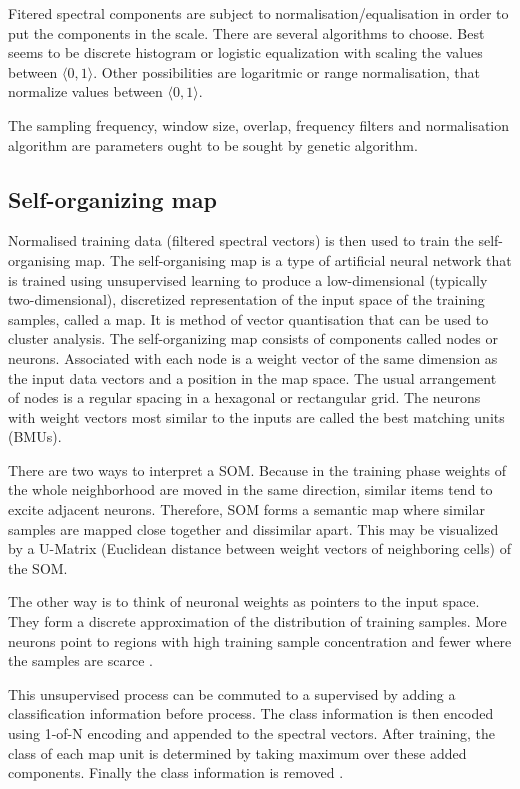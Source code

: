 \documentclass[a4paper,jurnal]{IEEEtran}
\begin{document}
Fitered spectral components are subject to normalisation/equalisation
in order to put the components
in the scale. There are several algorithms to choose. Best seems to be 
discrete histogram \cite{hist} or logistic equalization with scaling the values between 
$ \langle 0, 1 \rangle $.
Other possibilities are logaritmic or range normalisation, that normalize
values between $ \langle 0, 1 \rangle $.

The sampling frequency, window size, overlap, frequency filters and 
normalisation algorithm
are parameters ought to be sought by genetic algorithm.

\subsection{Self-organizing map}
Normalised training data (filtered spectral vectors) is then used to train 
the self-organising map.
The self-organising map is a type of artificial neural network that is
trained using unsupervised learning to produce a low-dimensional 
(typically two-dimensional), discretized representation of the input 
space of the training samples, called a map. It is method of vector 
quantisation that can be used to 
cluster analysis.
The self-organizing map consists of components called nodes or neurons. 
Associated with each node is a weight vector of the same dimension 
as the input data vectors and a position in the map space. 
The usual arrangement of nodes is a regular spacing in a hexagonal or rectangular grid. 
The neurons with weight vectors most similar to the inputs are called 
the best matching units (BMUs).

There are two ways to interpret a SOM. 
Because in the training phase weights of the whole neighborhood are moved in the 
same direction, similar items tend to excite adjacent neurons. Therefore, 
SOM forms a semantic map where similar samples are mapped close together 
and dissimilar apart. This may be visualized by a U-Matrix 
(Euclidean distance between weight vectors of neighboring cells) of the SOM.

The other way is to think of neuronal weights as pointers to the input space. 
They form a discrete approximation of the distribution of training samples.
More neurons point to regions with high training sample concentration and 
fewer where the samples are scarce \cite{somwiki}.

This unsupervised process can be commuted to a supervised by adding a classification
information before process.
The class information is then encoded using 1-of-N encoding and appended to the 
spectral vectors. After training, the class of each map unit
is determined by taking maximum over these added components.
Finally the class information is removed \cite{somtoolbox}.
\end{document}
